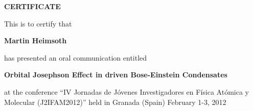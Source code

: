 \documentclass [13pt,a4paper] {letter}
\begin{document}
\pagestyle{empty} 
\begin{verbatim}






\end{verbatim}
\pagestyle{empty}
\begin{center}
{\bf {\Huge CERTIFICATE}}

\vspace {1.5cm}
This is to certify that
\vspace {1cm}

{\bf \Large  Martin    Heimsoth }
\vspace {1cm}

has presented an oral communication entitled
\vspace {1cm}

{\bf \large  Orbital Josephson Effect in driven Bose-Einstein Condensates }
\vspace {1cm}

at the conference { \textquotedblleft IV Jornadas de Jóvenes Investigadores en Física Atómica y Molecular (J2IFAM2012)\textquotedblright} 
held in Granada (Spain) February 1-3, 2012
\end{center}
\end{document}
